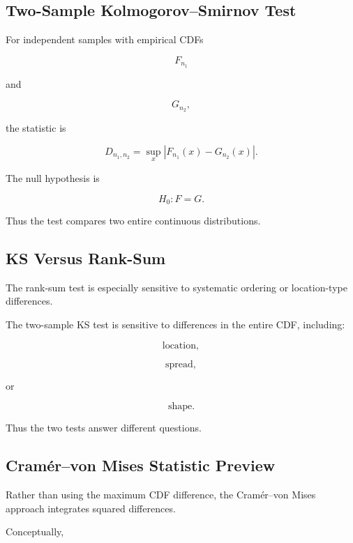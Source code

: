 \subsection{Two-Sample Kolmogorov--Smirnov Test}
\label{subsec:two-sample-ks}

For independent samples with empirical CDFs

\[
F_{n_1}
\]

and

\[
G_{n_2},
\]

the statistic is

\[
\boxed{
D_{n_1,n_2}
=
\sup_x
|
F_{n_1}(x)-G_{n_2}(x)
|.
}
\]

The null hypothesis is

\[
\boxed{
H_0:
F=G.
}
\]

Thus the test compares two entire continuous distributions.

\subsection{KS Versus Rank-Sum}
\label{subsec:ks-versus-rank-sum}

The rank-sum test is especially sensitive to systematic ordering or
location-type differences.

The two-sample KS test is sensitive to differences in the entire CDF,
including:

\[
\boxed{
\text{location},
}
\]

\[
\boxed{
\text{spread},
}
\]

or

\[
\boxed{
\text{shape}.
}
\]

Thus the two tests answer different questions.

\subsection{Cramér--von Mises Statistic Preview}
\label{subsec:cramer-von-mises-preview}

Rather than using the maximum CDF difference, the Cramér--von Mises
approach integrates squared differences.

Conceptually,

